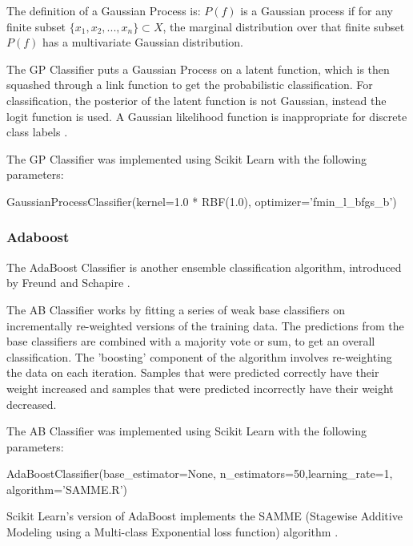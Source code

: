 The definition of a Gaussian Process is: $P(f)$ is a Gaussian process if for any finite subset $\{x_1,x_2,...,x_n\} \subset X$, the marginal distribution over that finite subset $P(f)$ has a multivariate Gaussian distribution.

The GP Classifier puts a Gaussian Process on a latent function, which is then squashed through a link function to get the probabilistic classification. For classification, the posterior of the latent function is not Gaussian, instead the logit function is used. A Gaussian likelihood function is inappropriate for discrete class labels \cite{gaussianProcesses2006}.

The GP Classifier was implemented using Scikit Learn with the following parameters:

\begin{tcolorbox}
\begin{center}
	GaussianProcessClassifier(kernel=1.0 * RBF(1.0), optimizer='fmin\_l\_bfgs\_b')
\end{center}
\end{tcolorbox}

\subsubsection*{Adaboost}

The AdaBoost Classifier is another ensemble classification algorithm, introduced by Freund and Schapire \cite{adaboost1997}.

The AB Classifier works by fitting a series of weak base classifiers on incrementally re-weighted versions of the training data. The predictions from the base classifiers are combined with a majority vote or sum, to get an overall classification. The 'boosting' component of the algorithm involves re-weighting the data on each iteration. Samples that were predicted correctly have their weight increased and samples that were predicted incorrectly have their weight decreased.

The AB Classifier was implemented using Scikit Learn with the following parameters:

\begin{tcolorbox}
\begin{center}
	AdaBoostClassifier(base\_estimator=None, n\_estimators=50,learning\_rate=1, algorithm=’SAMME.R’)
\end{center}
\end{tcolorbox}

Scikit Learn's version of AdaBoost implements the SAMME (Stagewise Additive Modeling using a Multi-class Exponential loss function) algorithm \cite{multiclassada2009}.

